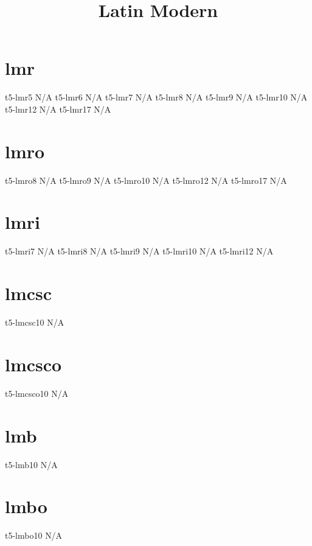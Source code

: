 \documentclass[sample]{vnsample}
\title{Latin Modern}
\begin{document}
\section{lmr}
      {t5-lmr5}            {N/A}
      {t5-lmr6}            {N/A}
      {t5-lmr7}            {N/A}
      {t5-lmr8}            {N/A}
      {t5-lmr9}            {N/A}
      {t5-lmr10}           {N/A}
      {t5-lmr12}           {N/A}
      {t5-lmr17}           {N/A}

\section{lmro}
     {t5-lmro8}           {N/A}
     {t5-lmro9}           {N/A}
     {t5-lmro10}          {N/A}
     {t5-lmro12}          {N/A}
     {t5-lmro17}          {N/A}

\section{lmri}
     {t5-lmri7}           {N/A}
     {t5-lmri8}           {N/A}
     {t5-lmri9}           {N/A}
     {t5-lmri10}          {N/A}
     {t5-lmri12}          {N/A}

\section{lmcsc}
     {t5-lmcsc10}         {N/A}

\section{lmcsco}
   {t5-lmcsco10}        {N/A}

\section{lmb}
      {t5-lmb10}           {N/A}

\section{lmbo}
     {t5-lmbo10}          {N/A}
\end{document}
